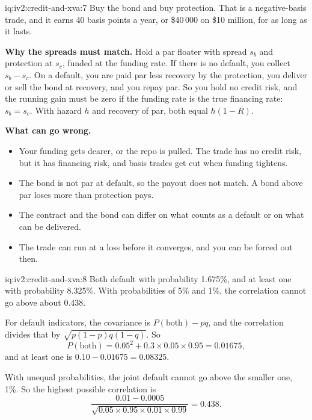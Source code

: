\begin{solution}{iq:iv2:credit-and-xva:7}
Buy the bond and buy protection. That is a negative-basis trade, and it earns 40 basis points a year, or \$40\,000 on \$10 million, for as long as it lasts.

\textbf{Why the spreads must match.} Hold a par floater with spread $s_b$ and protection at $s_c$, funded at the funding rate. If there is no default, you collect $s_b - s_c$. On a default, you are paid par less recovery by the protection, you deliver or sell the bond at recovery, and you repay par. So you hold no credit risk, and the running gain must be zero if the funding rate is the true financing rate: $s_b = s_c$. With hazard $h$ and recovery of par, both equal $h(1 - R)$.

\textbf{What can go wrong.}
\begin{itemize}
\item Your funding gets dearer, or the repo is pulled. The trade has no credit risk, but it has financing risk, and basis trades get cut when funding tightens.
\item The bond is not par at default, so the payout does not match. A bond above par loses more than protection pays.
\item The contract and the bond can differ on what counts as a default or on what can be delivered.
\item The trade can run at a loss before it converges, and you can be forced out then.
\end{itemize}

\end{solution}

\begin{solution}{iq:iv2:credit-and-xva:8}
Both default with probability 1.675\%, and at least one with probability 8.325\%. With probabilities of 5\% and 1\%, the correlation cannot go above about 0.438.

For default indicators, the covariance is $P(\text{both}) - pq$, and the correlation divides that by $\sqrt{p(1 - p)q(1 - q)}$. So
\[
P(\text{both}) = 0.05^2 + 0.3 \times 0.05 \times 0.95 = 0.01675,
\]
and at least one is $0.10 - 0.01675 = 0.08325$.

With unequal probabilities, the joint default cannot go above the smaller one, 1\%. So the highest possible correlation is
\[
\frac{0.01 - 0.0005}{\sqrt{0.05 \times 0.95 \times 0.01 \times 0.99}} = 0.438.
\]

\end{solution}

